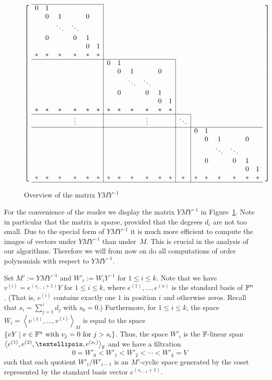 \begin{figure}
\[ \left[ \ \begin{array}{cccccc|cccccc|c|cccccc}
\cline{1-6}
  0 & 1 &      &      &   &   \\
    & 0 & 1    &      & 0 &   \\
    &   &\ddots&\ddots&   &   \\
    & 0 &      &   0  & 1 &   \\
    &   &      &      & 0 & 1 \\
  {}* & * &   *  &   *  & * & * \\
\cline{1-12}
  &&&&&& 0 & 1 &      &      &   &   \\
  &&&&&&  & 0 & 1    &      & 0 &   \\
  &&&&&&  &   &\ddots&\ddots&   &   \\
  &&&&&&  & 0 &      &   0  & 1 &   \\
  &&&&&&  &   &      &      & 0 & 1 \\
  {}*&*&*&*&*&*&* & * &   *  &   *  & * & * \\
\cline{1-13}
  &&&\vdots&&& &&&\vdots&&& \ddots \\
\cline{1-19}
  &&&&&& &&&&&& & 0 & 1 &      &      &   &   \\
  &&&&&& &&&&&& & & 0 & 1    &      & 0 &   \\
  &&&&&& &&&&&& & &   &\ddots&\ddots&   &   \\
  &&&&&& &&&&&& & & 0 &      &   0  & 1 &   \\
  &&&&&& &&&&&& & &   &      &      & 0 & 1 \\
  {}*&*&*&*&*&*& *&*&*&*&*&*&* &*& * &   *  &   *  & * & * \\
\hline
\end{array} \ \right] \]
\caption{Overview of the matrix $YMY^{-1}$}
\label{bigmat}
\end{figure}

For the convenience of the reader we display the matrix
$YMY^{-1}$ in Figure~\ref{bigmat}. Note in particular that the matrix is
sparse, provided that the degrees $d_i$ are not too small.
Due to the special form of $YMY^{-1}$ it is much more efficient to compute
the images of vectors under $YMY^{-1}$ than under~$M$. 
This is crucial in the analysis of our algorithms. 
Therefore we will from now on do all computations of order polynomials
with respect to $YMY^{-1}$.

Set $M' := YMY^{-1}$ and $W'_i := W_i Y^{-1}$ for $1 \le i \le k$.
Note that we have $v^{(i)} = e^{(s_{i-1}+1)} Y$ for $1 \le i \le k$,
where $e^{(1)}, \ldots, e^{(n)}$ is the standard basis of $\mathbb{F}^n$. (That is,  
 $e^{(i)}$ contains exactly one $1$ in position $i$ and otherwise zeros. Recall
that $s_i = \sum_{j=1}^i d_j$ with $s_0 = 0$.) Furthermore, for $1 \le i \le k$,
the space $W_i = \left< v^{(1)}, \ldots, v^{(i)} \right>_M$ is equal to the space
$\{ vY \mid v \in \mathbb{F}^n \mbox{ with } v_j = 0 \mbox{ for } j > s_i \}$. 
Thus, the space $W'_i$ is the $\mathbb{F}$-linear
span $\left< e^{(1)}, e^{(2)}, \ldots, e^{(s_i)}\right>_\F$ and we have a
filtration
\[ 0 = W'_0 < W'_1 < W'_2 < \cdots < W'_k = V \]
such that each quotient $W'_i/W'_{i-1}$ is an $M'$-cyclic space generated 
by the coset represented by the standard basis vector $e^{(s_{i-1}+1)}$.

